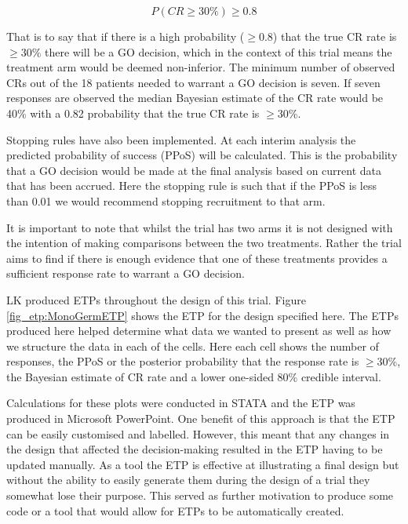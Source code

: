 \begin{equation}
	P(CR \geq 30\%) \geq 0.8
\end{equation}

That is to say that if there is a high probability ($\geq 0.8$) that the true CR rate is $\geq30$\% there will be a GO decision, which in the context of this trial means the treatment arm would be deemed non-inferior. The minimum number of observed CRs out of the 18 patients needed to warrant a GO decision is seven. If seven responses are observed the median Bayesian estimate of the CR rate would be 40\% with a 0.82 probability that the true CR rate is $\geq30$\%. 

Stopping rules have also been implemented. At each interim analysis the predicted probability of success (PPoS) will be calculated. This is the probability that a GO decision would be made at the final analysis based on current data that has been accrued. Here the stopping rule is such that if the PPoS is less than 0.01 we would recommend stopping recruitment to that arm. 

It is important to note that whilst the trial has two arms it is not designed with the intention of making comparisons between the two treatments. Rather the trial aims to find if there is enough evidence that one of these treatments provides a sufficient response rate to warrant a GO decision.  

LK produced ETPs throughout the design of this trial. Figure \ref{fig_etp:MonoGermETP} shows the ETP for the design specified here. The ETPs produced here helped determine what data we wanted to present as well as how we structure the data in each of the cells. Here each cell shows the number of responses, the PPoS or the posterior probability that the response rate is $\geq30$\%, the Bayesian estimate of CR rate and a lower one-sided 80\% credible interval.

Calculations for these plots were conducted in STATA and the ETP was produced in Microsoft PowerPoint. One benefit of this approach is that the ETP can be easily customised and labelled. However, this meant that any changes in the design that affected the decision-making resulted in the ETP having to be updated manually. As a tool the ETP is effective at illustrating a final design but without the ability to easily generate them during the design of a trial they somewhat lose their purpose. This served as further motivation to produce some code or a tool that would allow for ETPs to be automatically created. 

